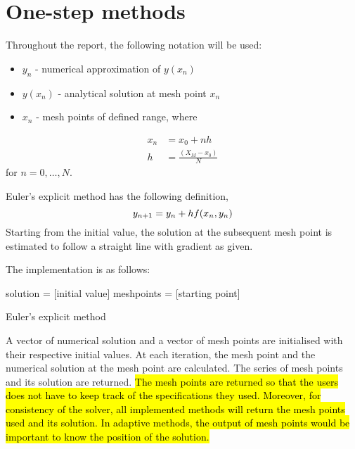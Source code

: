 \section{One-step methods}
\label{sec:one-step-method}
Throughout the report, the following notation will be used:
\begin{itemize}
    \item $y_n$ - numerical approximation of $y(x_n)$
    \item $y(x_n)$ - analytical solution at mesh point $x_n$
    \item $x_n$ - mesh points of defined range, where
\end{itemize}

\begin{align}
    x_n &= x_0 + nh\\
    h &= \frac{(X_M - x_0)}{N}
\end{align}
for $n = 0,\dots, N$.

Euler's explicit method has the following definition,  
\begin{equation}
    y_{n+1} = y_n + hf(x_n,y_n)\\
\end{equation}
Starting from the initial value, the solution at the subsequent mesh point is estimated to follow a straight line with gradient as given.

The implementation is as follows:

\begin{algorithm}[H]
    \SetAlgoLined
    solution = [initial value]\;
    meshpoints = [starting point]\;
    \;
\caption{Euler's explicit method}
\end{algorithm}

A vector of numerical solution and a vector of mesh points are initialised with their respective initial values. At each iteration, the mesh point and the numerical solution at the mesh point are calculated. The series of mesh points and its solution are returned. \hl{The mesh points are returned so that the users does not have to keep track of the specifications they used. Moreover, for consistency of the solver, all implemented methods will return the mesh points used and its solution. In adaptive methods, the output of mesh points would be important to know the position of the solution.}

